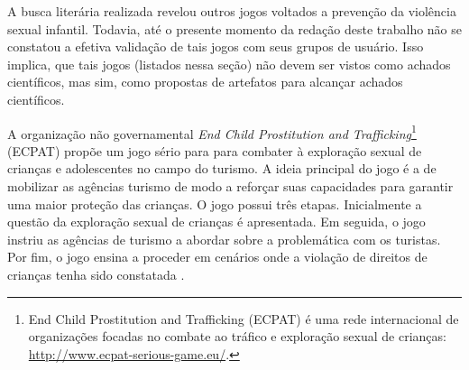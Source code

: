 A busca literária realizada revelou outros jogos voltados a prevenção da violência sexual infantil. Todavia, até o presente momento da redação deste trabalho não se constatou a efetiva validação de tais jogos com seus grupos de usuário. Isso implica, que tais jogos (listados nessa seção) não devem ser vistos como achados científicos, mas sim, como propostas de artefatos para alcançar achados científicos. 

A organização não governamental \textit{End Child Prostitution and Trafficking}\footnote{End Child Prostitution and Trafficking (ECPAT) é uma rede internacional de organizações focadas no combate ao tráfico e exploração sexual de crianças: \url{http://www.ecpat-serious-game.eu/}.}
(ECPAT) propõe um jogo sério para para combater à exploração sexual de crianças e adolescentes no campo do turismo. A ideia principal do jogo é a de mobilizar as agências turismo de modo a reforçar suas capacidades para garantir uma maior proteção das crianças. O jogo possui três etapas. Inicialmente a questão da exploração sexual de crianças é apresentada. Em seguida, o jogo instriu as agências de turismo a abordar sobre a problemática com os turistas. Por fim, o jogo ensina a proceder em cenários onde a violação de direitos de crianças tenha sido constatada \cite{gopalan2018social}. %


 






